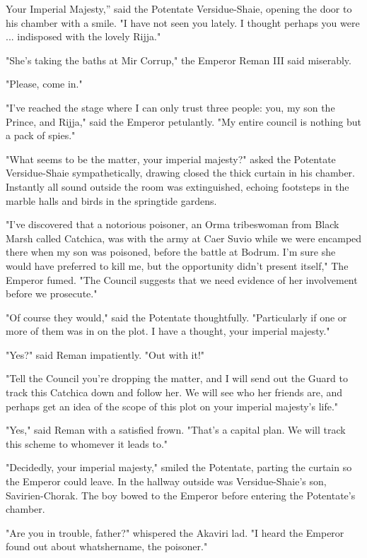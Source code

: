\clearpage
{}

\dropcap Your Imperial Majesty,'' said the Potentate Versidue-Shaie, opening the door to his chamber with a smile. "I have not seen you lately. I thought perhaps you were ... indisposed with the lovely Rijja."

"She's taking the baths at Mir Corrup," the Emperor Reman III said miserably.

"Please, come in."

"I've reached the stage where I can only trust three people: you, my son the Prince, and Rijja," said the Emperor petulantly. "My entire council is nothing but a pack of spies."

"What seems to be the matter, your imperial majesty?" asked the Potentate Versidue-Shaie sympathetically, drawing closed the thick curtain in his chamber. Instantly all sound outside the room was extinguished, echoing footsteps in the marble halls and birds in the springtide gardens.

"I've discovered that a notorious poisoner, an Orma tribeswoman from Black Marsh called Catchica, was with the army at Caer Suvio while we were encamped there when my son was poisoned, before the battle at Bodrum. I'm sure she would have preferred to kill me, but the opportunity didn't present itself," The Emperor fumed. "The Council suggests that we need evidence of her involvement before we prosecute."

"Of course they would," said the Potentate thoughtfully. "Particularly if one or more of them was in on the plot. I have a thought, your imperial majesty."

"Yes?" said Reman impatiently. "Out with it!"

"Tell the Council you're dropping the matter, and I will send out the Guard to track this Catchica down and follow her. We will see who her friends are, and perhaps get an idea of the scope of this plot on your imperial majesty's life."

"Yes," said Reman with a satisfied frown. "That's a capital plan. We will track this scheme to whomever it leads to."

"Decidedly, your imperial majesty," smiled the Potentate, parting the curtain so the Emperor could leave. In the hallway outside was Versidue-Shaie's son, Savirien-Chorak. The boy bowed to the Emperor before entering the Potentate's chamber.

"Are you in trouble, father?" whispered the Akaviri lad. "I heard the Emperor found out about whatshername, the poisoner."

